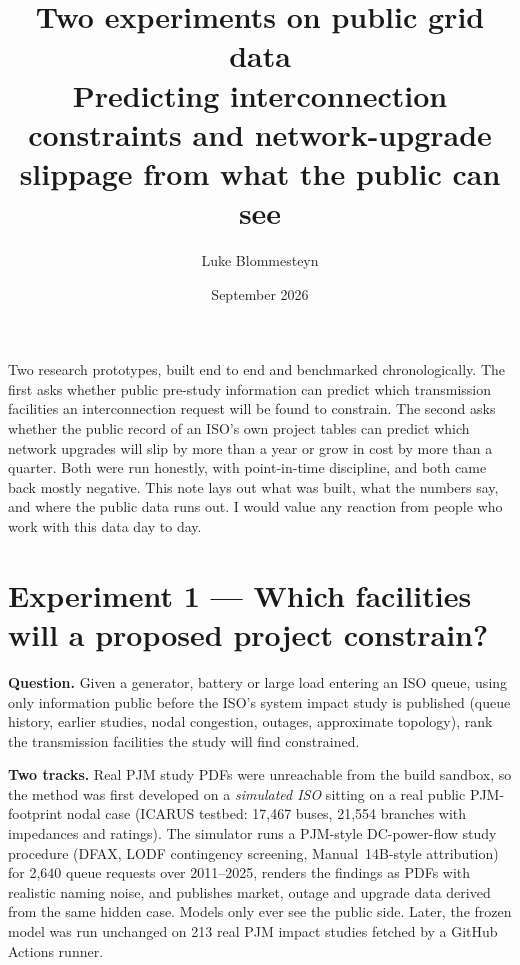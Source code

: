 \documentclass[11pt,a4paper]{article}
\title{\vspace{-1.2cm}\textbf{Two experiments on public grid data}\\[4pt]
\large Predicting interconnection constraints and network-upgrade slippage from what the public can see}
\author{Luke Blommesteyn}
\date{September 2026}
\begin{document}
\maketitle
\vspace{-0.8cm}

\begin{center}
\begin{minipage}{0.92\textwidth}
\small\color{ink2}
Two research prototypes, built end to end and benchmarked chronologically. The first asks whether public
pre-study information can predict which transmission facilities an interconnection request will be found to
constrain. The second asks whether the public record of an ISO's own project tables can predict which
network upgrades will slip by more than a year or grow in cost by more than a quarter. Both were run
honestly, with point-in-time discipline, and both came back mostly negative. This note lays out what was
built, what the numbers say, and where the public data runs out. I would value any reaction from people who
work with this data day to day.
\end{minipage}
\end{center}

\section*{Experiment 1 --- Which facilities will a proposed project constrain?}

\textbf{Question.} Given a generator, battery or large load entering an ISO queue, using only information
public before the ISO's system impact study is published (queue history, earlier studies, nodal congestion,
outages, approximate topology), rank the transmission facilities the study will find constrained.

\textbf{Two tracks.} Real PJM study PDFs were unreachable from the build sandbox, so the method was first
developed on a \emph{simulated ISO} sitting on a real public PJM-footprint nodal case (ICARUS testbed:
17{,}467 buses, 21{,}554 branches with impedances and ratings). The simulator runs a PJM-style DC-power-flow
study procedure (DFAX, LODF contingency screening, Manual~14B-style attribution) for 2{,}640 queue requests
over 2011--2025, renders the findings as PDFs with realistic naming noise, and publishes market, outage and
upgrade data derived from the same hidden case. Models only ever see the public side. Later, the frozen
model was run unchanged on 213 real PJM impact studies fetched by a GitHub Actions runner.
\end{document}
